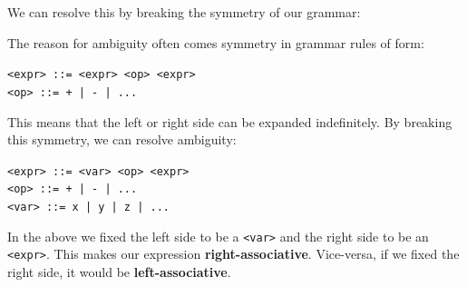 \noindent
We can resolve this by breaking the symmetry of our grammar:
\begin{theo}

    The reason for ambiguity often comes symmetry in grammar rules of form:
    \begin{center}
        \texttt{<expr> ::= <expr> <op> <expr>}\\
        \texttt{<op> ::= + | - | ...} \hspace{1.8em} \null
    \end{center}

    \noindent
    This means that the left or right side can be expanded indefinitely. By breaking this symmetry, we can resolve ambiguity:
    \begin{center}
        \texttt{<expr> ::= <var> <op> <expr>}\\
        \texttt{<op> ::= + | - | ...} \hspace{1.3em} \null\\
        \texttt{<var> ::= x | y | z | ...} \hspace{-.3em} \null
    \end{center}
    \noindent
    In the above we fixed the left side to be a \texttt{<var>} and the right side to be an \texttt{<expr>}.
    This makes our expression \textbf{right-associative}. Vice-versa, if we fixed the right side, it would be \textbf{left-associative}.
\end{theo}

